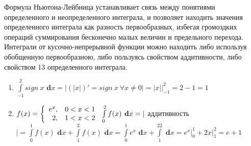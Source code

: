 \documentclass[a4paper,12pt]{bookest}
\theoremstyle{remark}
\newcommand\dx{\textbf{ d}x}
\begin{document}
Формула Ньютона-Лейбница устанавливает связь между понятиями определенного и неопределенного интеграла, и позволяет находить значения определенного интеграла как разность первообразных, избегая громоздких операций суммирования бесконечно малых величин и предельного перехода. Интеграли от кусочно-непрерывной функции можно находить либо используя обобщенную первообразною, либо пользуясь свойством аддитивности, либо свойством 13 определенного интеграла.
\begin{example}
	\begin{enumerate}
		\item $\int\limits_{-1}^{2}sign\>x\dx=\left|(|x|)'=sign\>x\>\forall x\ne0 \right|=|x|\big|_{-1}^2=2-1=1$
		\item $f(x)=\left\{\begin{array}{rl}
			e^x,&0<x<1\\
			2,&1<x<2
		\end{array}\right.\\\int\limits_0^2f(x)\dx=|$ аддитивность $|=\int\limits_0^1f(x)\dx+\int\limits_1^2f(x)\dx=\int\limits_0^1e^x\dx+\int\limits_1^22\dx=e^x\big|_0^1+2x\big|_1^2=e+1$
	\end{enumerate}
\end{example}
\end{document}

